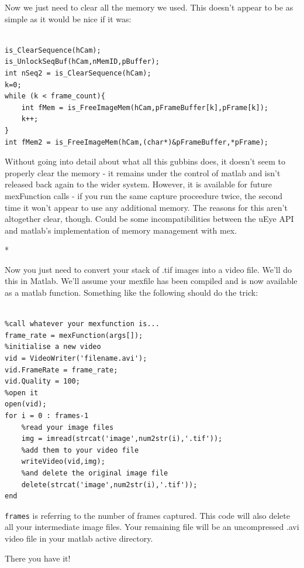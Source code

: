 \documentclass[12pt,a4paper]{article}
\begin{document}
Now we just need to clear all the memory we used. This doesn't appear to be as simple as it would be nice if it was:

\lstset{language=C++}
\begin{lstlisting}

is_ClearSequence(hCam);
is_UnlockSeqBuf(hCam,nMemID,pBuffer);
int nSeq2 = is_ClearSequence(hCam);
k=0;
while (k < frame_count){
	int fMem = is_FreeImageMem(hCam,pFrameBuffer[k],pFrame[k]);
	k++;
}
int fMem2 = is_FreeImageMem(hCam,(char*)&pFrameBuffer,*pFrame);

\end{lstlisting}

Without going into detail about what all this gubbins does, it doesn't seem to properly clear the memory - it remains under the control of matlab and isn't released back again to the wider system. However, it is available for future mexFunction calls - if you run the same capture proceedure twice, the second time it won't appear to use any additional memory. The reasons for this aren't altogether clear, though. Could be some incompatibilities between the uEye API and matlab's implementation of memory management with mex.

*

Now you just need to convert your stack of .tif images into a video file. We'll do this in Matlab. We'll assume your mexfile has been compiled and is now available as a matlab function. Something like the following should do the trick:

\lstset{language=matlab}
\lstset{upquote=true}
\begin{lstlisting}

%call whatever your mexfunction is...
frame_rate = mexFunction(args[]);
%initialise a new video
vid = VideoWriter('filename.avi');
vid.FrameRate = frame_rate;
vid.Quality = 100;
%open it
open(vid);
for i = 0 : frames-1
	%read your image files
	img = imread(strcat('image',num2str(i),'.tif'));
	%add them to your video file
	writeVideo(vid,img);
	%and delete the original image file
	delete(strcat('image',num2str(i),'.tif'));
end

\end{lstlisting}

\texttt{frames} is referring to the number of frames captured. This code will also delete all your intermediate image files. Your remaining file will be an uncompressed .avi video file in your matlab active directory.

There you have it!
\end{document}
